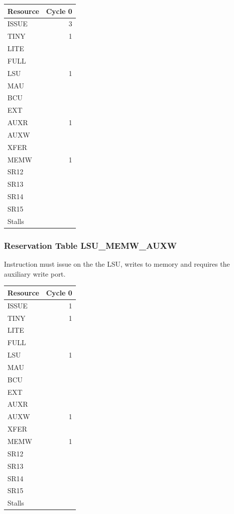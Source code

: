 \begin{tabular}{|l|r|} \hline
Resource	& Cycle 0 \\ \hline
\textsf{ISSUE}	& 3	\\
\textsf{TINY}	& 1	\\
\textsf{LITE}	& 	\\
\textsf{FULL}	& 	\\
\textsf{LSU}	& 1	\\
\textsf{MAU}	& 	\\
\textsf{BCU}	& 	\\
\textsf{EXT}	& 	\\
\textsf{AUXR}	& 1	\\
\textsf{AUXW}	& 	\\
\textsf{XFER}	& 	\\
\textsf{MEMW}	& 1	\\
\textsf{SR12}	& 	\\
\textsf{SR13}	& 	\\
\textsf{SR14}	& 	\\
\textsf{SR15}	& 	\\
\hline Stalls	& 	\\
\hline \end{tabular}

\subsubsection{Reservation Table LSU\_MEMW\_AUXW} \label{sec:reservation-LSU-MEMW-AUXW}

Instruction must issue on the the LSU, writes to memory and requires the auxiliary write port.
\medskip

\begin{tabular}{|l|r|} \hline
Resource	& Cycle 0 \\ \hline
\textsf{ISSUE}	& 1	\\
\textsf{TINY}	& 1	\\
\textsf{LITE}	& 	\\
\textsf{FULL}	& 	\\
\textsf{LSU}	& 1	\\
\textsf{MAU}	& 	\\
\textsf{BCU}	& 	\\
\textsf{EXT}	& 	\\
\textsf{AUXR}	& 	\\
\textsf{AUXW}	& 1	\\
\textsf{XFER}	& 	\\
\textsf{MEMW}	& 1	\\
\textsf{SR12}	& 	\\
\textsf{SR13}	& 	\\
\textsf{SR14}	& 	\\
\textsf{SR15}	& 	\\
\hline Stalls	& 	\\
\hline \end{tabular}

